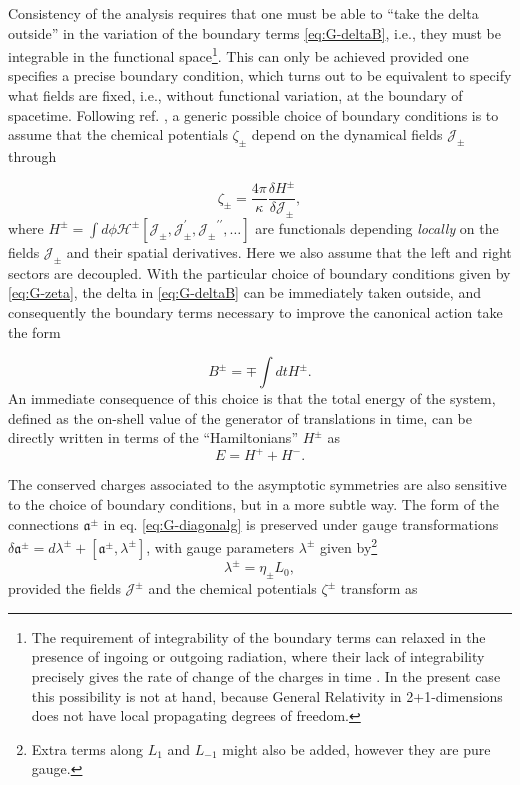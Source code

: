 \documentclass[letterpaper,11pt,oneside]{book}
\begin{document}
Consistency of the analysis requires that one must be able to ``take
the delta outside'' in the variation of the boundary terms \eqref{eq:G-deltaB},
i.e., they must be integrable in the functional space\footnote{The requirement of integrability of the boundary terms can relaxed
	in the presence of ingoing or outgoing radiation, where their lack
	of integrability precisely gives the rate of change of the charges
	in time \cite{Barnich:2011mi,Bunster:2018yjr,Bunster:2019mup}. In
	the present case this possibility is not at hand, because General
	Relativity in 2+1-dimensions does not have local propagating degrees
	of freedom.}. This can only be achieved provided one specifies a precise boundary
condition, which turns out to be equivalent to specify what fields
are fixed, i.e., without functional variation, at the boundary of
spacetime. Following ref. \cite{Perez:2016vqo}, a generic possible
choice of boundary conditions is to assume that the chemical potentials
$\zeta_{\pm}$ depend on the dynamical fields $\mathcal{J_{\pm}}$
through

\begin{equation}
	\zeta_{\pm}=\frac{4\pi}{\kappa}\frac{\delta H^{\pm}}{\delta\mathcal{J_{\pm}}},\label{eq:G-zeta}
\end{equation}
where $H^{\pm}=\int d\phi\mathcal{H}^{\pm}[\mathcal{J_{\pm}},\mathcal{J}_{\pm}^{\prime},\mathcal{J_{\pm}}^{\prime\prime},\dots]$
are functionals depending \emph{locally} on the fields $\mathcal{J_{\pm}}$
and their spatial derivatives. Here we also assume that the left and
right sectors are decoupled. With the particular choice of boundary
conditions given by \eqref{eq:G-zeta}, the delta in \eqref{eq:G-deltaB}
can be immediately taken outside, and consequently the boundary terms
necessary to improve the canonical action take the form

\[
B^{\pm}=\mp\int dtH^{\pm}.
\]
An immediate consequence of this choice is that the total energy of
the system, defined as the on-shell value of the generator of translations
in time, can be directly written in terms of the ``Hamiltonians''
$H^{\pm}$ as
\begin{equation}
	E=H^{+}+H^{-}.\label{eq:G-Energia}
\end{equation}

The conserved charges associated to the asymptotic symmetries are
also sensitive to the choice of boundary conditions, but in a more
subtle way. The form of the connections $\mathfrak{a}^{\pm}$ in eq.
\eqref{eq:G-diagonalg} is preserved under gauge transformations $\delta\mathfrak{a}^{\pm}=d\lambda^{\pm}+\left[\mathfrak{a}^{\pm},\lambda^{\pm}\right]$,
with gauge parameters $\lambda^{\pm}$ given by\footnote{Extra terms along $L_{1}$ and $L_{-1}$ might also be added, however
	they are pure gauge.} 
\[
\lambda^{\pm}=\eta_{\pm}L_{0},
\]
provided the fields $\mathcal{J}^{\pm}$ and the chemical potentials
$\zeta^{\pm}$ transform as
\end{document}
